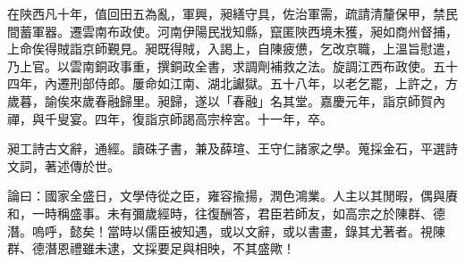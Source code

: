 \begin{pinyinscope}
在陜西凡十年，值回田五為亂，軍興，昶繕守具，佐治軍需，疏請清釐保甲，禁民間蓄軍器。遷雲南布政使。河南伊陽民戕知縣，竄匿陜西境未獲，昶如商州督捕，上命俟得賊詣京師覲見。昶既得賊，入謁上，自陳疲憊，乞改京職，上溫旨慰遣，乃上官。以雲南銅政事重，撰銅政全書，求調劑補救之法。旋調江西布政使。五十四年，內遷刑部侍郎。屢命如江南、湖北讞獄。五十八年，以老乞罷，上許之，方歲暮，諭俟來歲春融歸里。昶歸，遂以「春融」名其堂。嘉慶元年，詣京師賀內禪，與千叟宴。四年，復詣京師謁高宗梓宮。十一年，卒。

昶工詩古文辭，通經。讀硃子書，兼及薛瑄、王守仁諸家之學。蒐採金石，平選詩文詞，著述傳於世。

論曰：國家全盛日，文學侍從之臣，雍容揄揚，潤色鴻業。人主以其閒暇，偶與賡和，一時稱盛事。未有彌歲經時，往復酬答，君臣若師友，如高宗之於陳群、德潛。嗚呼，懿矣！當時以儒臣被知遇，或以文辭，或以書畫，錄其尤著者。視陳群、德潛恩禮雖未逮，文採要足與相映，不其盛歟！


\end{pinyinscope}